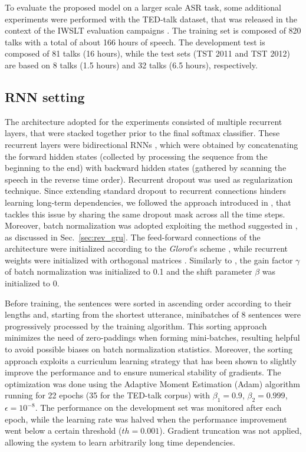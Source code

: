 \documentclass[journal]{IEEEtran}
\begin{document}
To evaluate the proposed model on a larger scale ASR task, some  additional experiments were performed with the TED-talk dataset, that was released in the context of the IWSLT evaluation campaigns \cite{iwslt_2011}. The training set is composed of 820 talks with a total of about 166 hours of speech. The development test is composed of 81 talks (16 hours), while the test sets (TST 2011 and TST 2012) are based on 8 talks (1.5 hours) and 32 talks (6.5 hours), respectively.



\subsection{RNN setting} \label{sec:rnn_setup}
The architecture adopted for the experiments consisted of multiple recurrent layers, that were stacked together prior to the final softmax classifier. These recurrent layers were bidirectional RNNs \cite{graves}, which were obtained by concatenating the forward hidden states (collected by processing the sequence from the beginning to the end) with backward hidden states (gathered by scanning the speech in the reverse time order).
Recurrent dropout was used as regularization technique. Since extending standard dropout to recurrent connections hinders learning long-term dependencies, we followed the approach introduced in \cite{drop_asru,Gal2016}, that tackles this issue by sharing the same dropout mask across all the time steps. Moreover,  batch normalization was adopted exploiting the method suggested in \cite{cesar}, as discussed in Sec.~\ref{sec:rev_gru}.
The feed-forward connections of the architecture were initialized according to the \textit{Glorot}'s scheme \cite{xavier}, while recurrent weights were initialized with orthogonal matrices \cite{orth_init}. Similarly to \cite{ravanelli_SLT}, the gain factor $\gamma$ of batch normalization was initialized to 0.1 and the shift parameter $\beta$ was initialized to 0.

Before training, the sentences were sorted in ascending order according to their lengths and, starting from the shortest utterance, minibatches of 8 sentences were progressively processed by the training algorithm.
This sorting approach minimizes the need of zero-paddings when forming mini-batches, resulting helpful to avoid possible biases on batch normalization statistics. %
Moreover, the sorting approach exploits a curriculum learning strategy \cite{curriculum} that has been shown to slightly improve the performance and to ensure numerical stability of gradients. The optimization was done using the Adaptive Moment Estimation (Adam) algorithm \cite{adam} running for 22 epochs (35 for the TED-talk corpus) with $\beta_1=0.9$, $\beta_2=0.999$, $\epsilon=10^{-8}$. The performance on the development set was monitored after each epoch, while the learning rate was halved when the performance improvement went below a certain threshold ($th=0.001$). Gradient truncation was not applied, allowing the system to learn arbitrarily long time dependencies.
\end{document}
